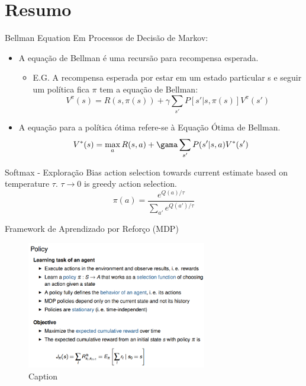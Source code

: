 \section{Resumo}

\begin{frame}{Bellman Equation}
    Em Processos de Decisão de Markov:
    \begin{itemize}
        \item A \alert{equação de Bellman é uma recursão para recompensa esperada}.
        \begin{itemize}
            \item E.G. A recompensa esperada por estar em um estado particular s e seguir um política fica $\pi$ tem a equação de Bellman:
            $$V^{\pi}(s) = R(s, \pi(s)) + \gamma \sum_{s'}{P[s'|s,\pi(s)]V^{\pi}(s')}$$
        \end{itemize}
    \end{itemize}
    
    \begin{itemize}
        \item A equação para a política ótima refere-se à \alert{Equação Ótima de Bellman}.
        $$V^{*}(s) = \max_{a}{R(s,a) + \gama \sum_{s'}{P(s'|s,a)V^*(s')}}$$
    \end{itemize}
\end{frame}

\begin{frame}{Softmax - Exploração}
    Bias action selection towards current estimate based on \alert{temperature} $\tau$. $\tau \rightarrow 0$ is greedy action selection.
    $$\pi(a) = \frac{e^{Q(a)/\tau}}{\sum_{a'}{e^{Q(a')/\tau}}}$$
\end{frame}

\begin{frame}{Framework de Aprendizado por Reforço (MDP)}
    \begin{figure}
        \centering
        \includegraphics[width=0.7\textwidth]{img/policy.png}
        \caption{Caption}
        \label{fig:my_label}
    \end{figure}
\end{frame}

